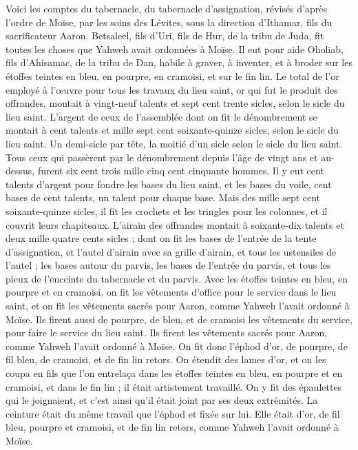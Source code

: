 \begin{multicols}{2}
Voici les comptes du tabernacle, du tabernacle d’assignation, révisés d’après l’ordre de Moïse, par les soins des Lévites, sous la direction d’Ithamar, fils du sacrificateur Aaron.
Betsaleel, fils d'Uri, fils de Hur, de la tribu de Juda, fit toutes les choses que Yahweh avait ordonnées à Moïse.
Il eut pour aide Oholiab, fils d'Ahisamac, de la tribu de Dan, habile à graver, à inventer, et à broder sur les étoffes teintes en bleu, en pourpre, en cramoisi, et sur le fin lin.
Le total de l’or employé à l’œuvre pour tous les travaux du lieu saint, or qui fut le produit des offrandes, montait à vingt-neuf talents et sept cent trente sicles, selon le sicle du lieu saint.
L'argent de ceux de l'assemblée dont on fit le dénombrement se montait à cent talents et mille sept cent soixante-quinze sicles, selon le sicle du lieu saint.
Un demi-sicle par tête, la moitié d'un sicle selon le sicle du lieu saint. Tous ceux qui passèrent par le dénombrement depuis l'âge de vingt ans et au-dessus, furent six cent trois mille cinq cent cinquante hommes.
Il y eut cent talents d'argent pour fondre les bases du lieu saint, et les bases du voile, cent bases de cent talents, un talent pour chaque base.
Mais des mille sept cent soixante-quinze sicles, il fit les crochets et les tringles pour les colonnes, et il couvrit leurs chapiteaux.
L'airain des offrandes montait à soixante-dix talents et deux mille quatre cents sicles ;
dont on fit les bases de l’entrée de la tente d'assignation, et l'autel d'airain avec sa grille d'airain, et tous les ustensiles de l'autel ;
les bases autour du parvis, les bases de l’entrée du parvis, et tous les pieux de l’enceinte du tabernacle et du parvis. Avec les étoffes teintes en bleu, en pourpre et en cramoisi, on fit les vêtements d’office pour le service dans le lieu saint, et on fit les vêtements sacrés pour Aaron, comme Yahweh l’avait ordonné à Moïse.
\VerseOne{}Ils firent aussi de pourpre, de bleu, et de cramoisi les vêtements du service, pour faire le service du lieu saint. Ils firent les vêtements sacrés pour Aaron, comme Yahweh l'avait ordonné à Moïse.
On fit donc l'éphod d'or, de pourpre, de fil bleu, de cramoisi, et de fin lin retors.
On étendit des lames d'or, et on les coupa en fils que l’on entrelaça dans les étoffes teintes en bleu, en pourpre et en cramoisi, et dans le fin lin ; il était artistement travaillé.
On y fit des épaulettes qui le joignaient, et c’est ainsi qu’il était joint par ses deux extrémités.
La ceinture était du même travail que l’éphod et fixée sur lui. Elle était d’or, de fil bleu, pourpre et cramoisi, et de fin lin retors, comme Yahweh l'avait ordonné à Moïse.

\end{multicols}
